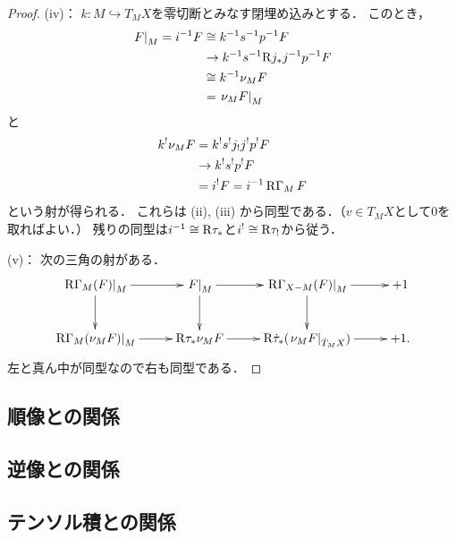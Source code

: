 \begin{proof}
    (iv)：
    \(k\colon M\hookrightarrow T_{M}X\)を零切断とみなす閉埋め込みとする．
    このとき，\begin{align*}
        \mres[F]{M}
        =i^{-1}F
        &\cong k^{-1}s^{-1}p^{-1}F\\
        &\to k^{-1}s^{-1}\Rder{j}_{\ast}j^{-1}p^{-1}F\\
        &\cong k^{-1}\nu_{M}F\\
        &=\mres[\nu_{M}F]{M}
    \end{align*}
    と\begin{align*}
        k^{!}\nu_{M}F
        &= k^{!}s^{!}j_{!}j^{!}p^{!}F\\
        &\to k^{!}s^{!}p^{!}F\\
        &= i^{!}F=i^{-1}\RG_{M}F
    \end{align*}
    という射が得られる．
    これらは (ii), (iii) から同型である．（\(v\in T_{M}X\)として\(0\)を取ればよい．）
    残りの同型は\(i^{-1}\cong \Rder{\tau}_{\ast}\)と\(i^{!}\cong \Rder{\tau}_{!}\)から従う．

    (v)：
    次の三角の射がある．
    \[    
        \vcenter{\xymatrix@C=26pt@R=26pt{
        \mres[\RG_{M}(F)]{M}    
        \ar[d]
        \ar[r]
        &
        \mres[F]{M}    
        \ar[r]
        \ar[d]
        &
        \mres[\RG_{X-M}(F)]{M}    
        \ar[r]
        \ar[d]
        &
        +1
        \\
        \mres[\RG_{M}(\nu_{M}F)]{M}    
        \ar[r]
        &
        \Rder{\tau_{\ast}}\nu_{M}F    
        \ar[r]
        &
        \Rder{\dot{\tau}}_{\ast}(\mres[\nu_{M}F]{\dot{T}_{M}X})    
        \ar[r]
        &
        +1.
      }}
    \]
    左と真ん中が同型なので右も同型である．
\end{proof}

\subsection*{順像との関係}
\subsection*{逆像との関係}
\subsection*{テンソル積との関係}

